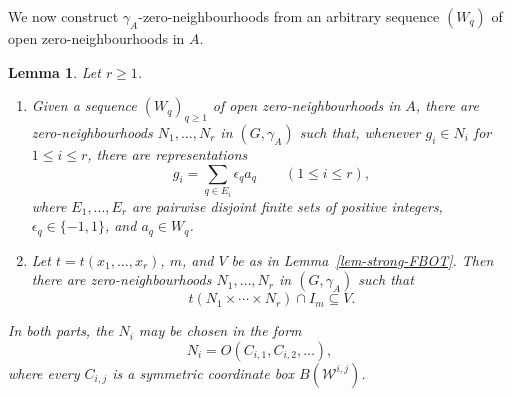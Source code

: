 \documentclass[preprint,3p]{elsarticle}
\theoremstyle{plain}
\newtheorem{lem}[thm]{Lemma}
\theoremstyle{definition}
\numberwithin{equation}{section}
\begin{document}
\begin{samepage}
We now construct $\gamma_A$-zero-neighbourhoods from an arbitrary
sequence $(W_q)$ of open zero-neighbourhoods in $A$.

\begin{lem}
\label{prop-gamma-bounded-control}
Let $r\geq1$.
\begin{enumerate}[label=(\alph*),ref=(\alph*)]
\item\label{gamma-labelled-representations}
Given a sequence $(W_q)_{q\geq1}$ of open zero-neighbourhoods in $A$,
there are zero-neighbourhoods $N_1,\ldots,N_r$ in $(G,\gamma_A)$
such that, whenever $g_i\in N_i$ for $1\leq i\leq r$, there are representations
\[
 g_i=\sum_{q\in E_i}\epsilon_q a_q
 \qquad(1\leq i\leq r),
\]
where $E_1,\ldots,E_r$ are pairwise disjoint finite sets of positive
integers, $\epsilon_q\in\{-1,1\}$, and $a_q\in W_q$.
\item\label{gamma-bounded-output}
Let $t=t(x_1,\ldots,x_r)$, $m$, and $V$ be as in
Lemma~\ref{lem-strong-FBOT}.  Then there are
zero-neighbourhoods $N_1,\ldots,N_r$ in $(G,\gamma_A)$ such that
\[
 t(N_1\times\cdots\times N_r)\cap I_m\subseteq V.
\]
\end{enumerate}
In both parts, the $N_i$ may be chosen in the form
\[
 N_i=O(C_{i,1},C_{i,2},\ldots),
\]
where every $C_{i,j}$ is a symmetric coordinate box
$B(\mathcal W^{i,j})$.
\end{lem}
\end{samepage}
\end{document}
